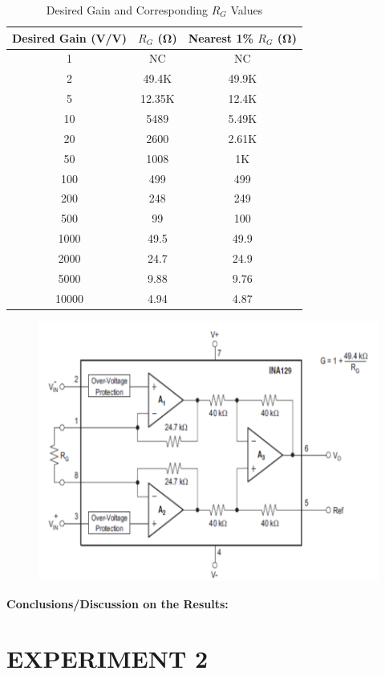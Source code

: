 \documentclass[9pt]{scrreprt}
\begin{document}
\begin{table}[ht]
\centering
\begin{tabular}{|c|c|c|}
\hline
\textbf{Desired Gain (V/V)} & \textbf{$R_G$ (\si{\ohm})} & \textbf{Nearest 1\% $R_G$ (\si{\ohm})} \\ \hline
1     & NC     & NC \\ \hline
2     & 49.4K  & 49.9K \\ \hline
5     & 12.35K & 12.4K \\ \hline
10    & 5489   & 5.49K \\ \hline
20    & 2600   & 2.61K \\ \hline
50    & 1008   & 1K    \\ \hline
100   & 499    & 499   \\ \hline
200   & 248    & 249   \\ \hline
500   & 99     & 100   \\ \hline
1000  & 49.5   & 49.9  \\ \hline
2000  & 24.7   & 24.9  \\ \hline
5000  & 9.88   & 9.76  \\ \hline
10000 & 4.94   & 4.87  \\ \hline
\end{tabular}
\caption{Desired Gain and Corresponding $R_G$ Values}
\label{table:rg_values}
\end{table}

\begin{figure}[H]
	\centering
	\includegraphics[width=0.5\linewidth]{logos/OP-Amp_gain_circuit.PNG}
	\label{fig:op-amp_gain}
\end{figure}

\textbf{Conclusions/Discussion on the Results:}


\newpage

\chapter*{\Large EXPERIMENT 2}
\setcounter{chapter}{2}
\setcounter{table}{0}
\end{document}
